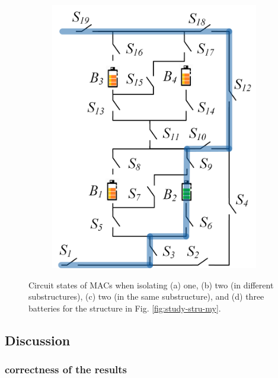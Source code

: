 \documentclass{article}
\begin{document}
\begin{figure}[htbp]
\begin{subfigure}[b]{0.31\textwidth}
        \includegraphics[width=\textwidth]{e2f2-isolate-3.png}
        \caption{}
        \label{fig:my-isolated-3}
    \end{subfigure}
    \caption{
        Circuit states of MACs when isolating (a) one, (b) two (in different substructures), (c) two (in the same substructure), and (d) three batteries for the structure in Fig. \ref{fig:study-stru-my}.
        }
\end{figure}

\subsection{Discussion}

\subsubsection{correctness of the results}
\end{document}
